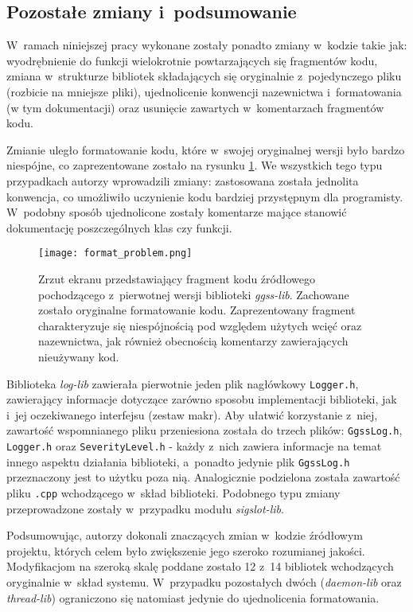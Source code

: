 \subsection{Pozostałe zmiany i~podsumowanie}
W~ramach niniejszej pracy wykonane zostały ponadto zmiany w~kodzie takie jak: wyodrębnienie do funkcji wielokrotnie powtarzających się fragmentów kodu, zmiana w~strukturze bibliotek składających się oryginalnie z~pojedynczego pliku (rozbicie na mniejsze pliki), ujednolicenie konwencji nazewnictwa i~formatowania (w tym dokumentacji) oraz usunięcie zawartych w~komentarzach fragmentów kodu.

Zmianie uległo formatowanie kodu, które w~swojej oryginalnej wersji było bardzo niespójne, co zaprezentowane zostało na rysunku \ref{fig:format_problem}. We wszystkich tego typu przypadkach autorzy wprowadzili zmiany: zastosowana została jednolita konwencja, co umożliwiło uczynienie kodu bardziej przystępnym dla programisty. W~podobny sposób ujednolicone zostały komentarze mające stanowić dokumentację poszczególnych klas czy funkcji.

\begin{figure}[H]
\centering
\texttt{[image: format\_problem.png]}
\caption{Zrzut ekranu przedstawiający fragment kodu źródłowego pochodzącego z~pierwotnej wersji biblioteki \emph{ggss-lib}. Zachowane zostało oryginalne formatowanie kodu. Zaprezentowany fragment charakteryzuje się niespójnością pod względem użytych wcięć oraz nazewnictwa, jak również obecnością komentarzy zawierających nieużywany kod.}
\label{fig:format_problem}
\end{figure}

Biblioteka \emph{log-lib} zawierała pierwotnie jeden plik nagłówkowy \lstinline{Logger.h}, zawierający informacje dotyczące zarówno sposobu implementacji biblioteki, jak i~jej oczekiwanego interfejsu (zestaw makr). Aby ułatwić korzystanie z~niej, zawartość wspomnianego pliku przeniesiona została do trzech plików: \lstinline{GgssLog.h}, \lstinline{Logger.h} oraz \lstinline{SeverityLevel.h} - każdy z~nich zawiera informacje na temat innego aspektu działania biblioteki, a~ponadto jedynie plik \lstinline{GgssLog.h} przeznaczony jest to użytku poza nią. Analogicznie podzielona została zawartość pliku \lstinline{.cpp} wchodzącego w~skład biblioteki. Podobnego typu zmiany przeprowadzone zostały w~przypadku modułu \emph{sigslot-lib}.

Podsumowując, autorzy dokonali znaczących zmian w~kodzie źródłowym projektu, których celem było zwiększenie jego szeroko rozumianej jakości. Modyfikacjom na szeroką skalę poddane zostało 12 z~14 bibliotek wchodzących oryginalnie w~skład systemu. W~przypadku pozostałych dwóch (\emph{daemon-lib} oraz \emph{thread-lib}) ograniczono się natomiast jedynie do ujednolicenia formatowania.

